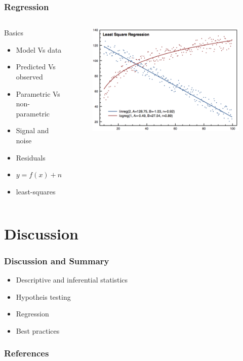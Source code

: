 \documentclass[10pt, compress]{beamer}
\begin{document}
\begin{frame}
    \frametitle{Regression}
    \begin{columns}
        \begin{block}{Basics}
            \begin{itemize}
                \item Model Vs data
                \item Predicted Vs observed
                \item Parametric Vs non-parametric
                \item Signal and noise
                \item Residuals
                \item $y = f(x) + n$
                \item least-squares
            \end{itemize}
        \end{block}
        \begin{block}{}
            \begin{figure}
                \begin{center}
                    \includegraphics[scale=0.2]{img/regression.png}
                \end{center}
            \end{figure}
        \end{block}
    \end{columns}
\end{frame}


\section{Discussion}

\begin{frame}
    \frametitle{Discussion and Summary}
    \begin{itemize}
        \item Descriptive and inferential statistics
        \item Hypotheis testing
        \item Regression
        \item Best practices
    \end{itemize}
\end{frame}

\begin{frame}
    \frametitle{References}
\end{frame}
\end{document}
